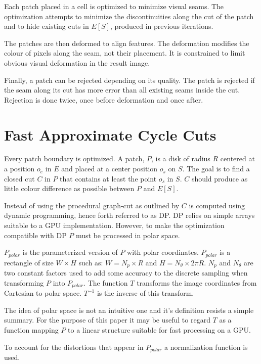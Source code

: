 \documentclass{acmsmall}
\begin{document}
Each patch placed in a cell is optimized to minimize visual seams. The optimization attempts to minimize the discontinuities along the cut of the patch and to hide existing cuts in $E[S]$, produced in previous iterations.

The patches are then deformed to align features. The deformation modifies the colour of pixels along the seam, not their placement. It is constrained to limit obvious visual deformation in the result image.

Finally, a patch can be rejected depending on its quality. The patch is rejected if the seam along its cut has more error than all existing seams inside the cut. Rejection is done twice, once before deformation and once after.

\section{Fast Approximate Cycle Cuts}


Every patch boundary is optimized. A patch, $P$, is a disk of radius $R$ centered at a position $o_e$ in $E$ and placed at a center position $o_s$ on $S$. The goal is to find a closed cut $C$ in $P$ that contains at least the point $o_s$ in $S$. $C$ should produce as little colour difference as possible between $P$ and $E[S]$.

Instead of using the procedural graph-cut as outlined by \cite{kwatra2003graphcut} $C$ is computed using dynamic programming, hence forth referred to as DP. DP relies on simple arrays suitable to a GPU implementation. However, to make the optimization compatible with DP $P$ must be processed in polar space. 

$P_{polar}$ is the parameterized version of $P$ with polar coordinates. $P_{polar}$ is a rectangle of size $W \times H$ such as: $W = N_p \times R$ and $H = N_\theta \times 2 \pi R$. $N_p$ and $N_\theta$ are two constant factors used to add some accuracy to the discrete sampling when transforming $P$ into $P_{polar}$. The function $T$ transforms the image coordinates from Cartesian to polar space. $T^{-1}$ is the inverse of this transform.

The idea of polar space is not an intuitive one and it's definition resists a simple summary. For the purpose of this paper it may be useful to regard $T$ as a function mapping $P$ to a linear structure suitable for fast processing on a GPU.

To account for the distortions that appear in $P_{polar}$ a normalization function is used.
\end{document}
